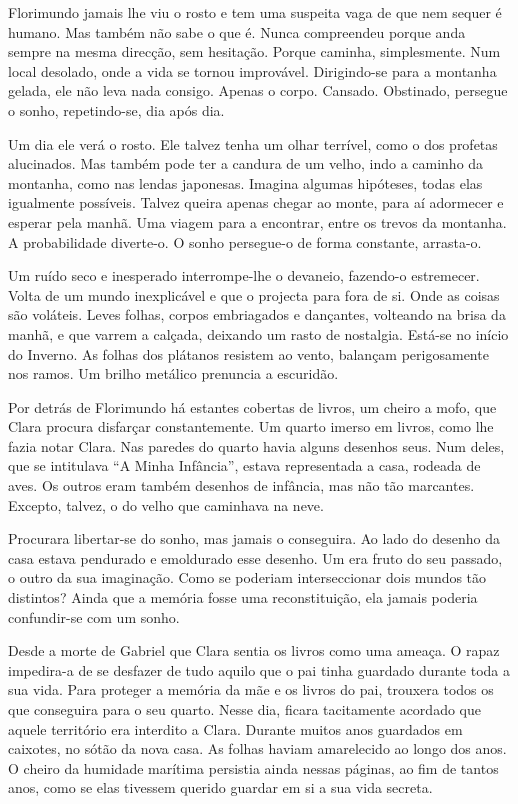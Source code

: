 Florimundo jamais lhe viu o rosto e tem uma suspeita vaga de que nem
sequer é humano. Mas também não sabe o que é. Nunca compreendeu porque
anda sempre na mesma direcção, sem hesitação. Porque caminha,
simplesmente. Num local desolado, onde a vida se tornou improvável.
Dirigindo-se para a montanha gelada, ele não leva nada consigo. Apenas o
corpo. Cansado. Obstinado, persegue o sonho, repetindo-se, dia após dia.

Um dia ele verá o rosto. Ele talvez tenha um olhar terrível, como o dos
profetas alucinados. Mas também pode ter a candura de um velho, indo a
caminho da montanha, como nas lendas japonesas. Imagina algumas
hipóteses, todas elas igualmente possíveis. Talvez queira apenas chegar
ao monte, para aí adormecer e esperar pela manhã. Uma viagem para a
encontrar, entre os trevos da montanha. A probabilidade diverte-o. O
sonho persegue-o de forma constante, arrasta-o.

Um ruído seco e inesperado interrompe-lhe o devaneio, fazendo-o
estremecer. Volta de um mundo inexplicável e que o projecta para fora de
si. Onde as coisas são voláteis. Leves folhas, corpos embriagados e
dançantes, volteando na brisa da manhã, e que varrem a calçada, deixando
um rasto de nostalgia. Está-se no início do Inverno. As folhas dos
plátanos resistem ao vento, balançam perigosamente nos ramos. Um brilho
metálico prenuncia a escuridão.

Por detrás de Florimundo há estantes cobertas de livros, um cheiro a
mofo, que Clara procura disfarçar constantemente. Um quarto imerso em
livros, como lhe fazia notar Clara. Nas paredes do quarto havia alguns
desenhos seus. Num deles, que se intitulava ``A Minha Infância'', estava
representada a casa, rodeada de aves. Os outros eram também desenhos de
infância, mas não tão marcantes. Excepto, talvez, o do velho que
caminhava na neve.

Procurara libertar-se do sonho, mas jamais o conseguira. Ao lado do
desenho da casa estava pendurado e emoldurado esse desenho. Um era fruto
do seu passado, o outro da sua imaginação. Como se poderiam
interseccionar dois mundos tão distintos? Ainda que a memória fosse uma
reconstituição, ela jamais poderia confundir-se com um sonho.

Desde a morte de Gabriel que Clara sentia os livros como uma ameaça. O
rapaz impedira-a de se desfazer de tudo aquilo que o pai tinha guardado
durante toda a sua vida. Para proteger a memória da mãe e os livros do
pai, trouxera todos os que conseguira para o seu quarto. Nesse dia,
ficara tacitamente acordado que aquele território era interdito a Clara.
Durante muitos anos guardados em caixotes, no sótão da nova casa. As
folhas haviam amarelecido ao longo dos anos. O cheiro da humidade
marítima persistia ainda nessas páginas, ao fim de tantos anos, como se
elas tivessem querido guardar em si a sua vida secreta.

